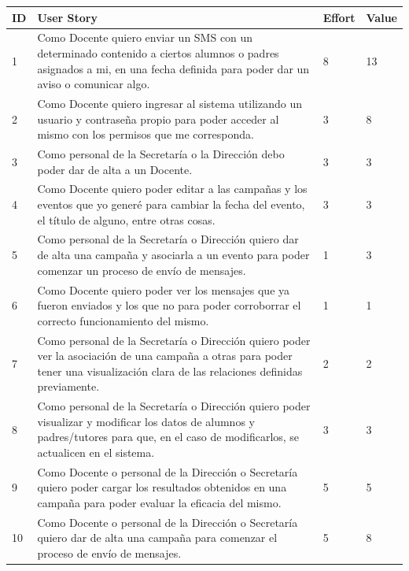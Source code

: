 \documentclass[a4paper, 11pt]{article}
\begin{document}
\begin{table}[H]
\centering
\begin{tabular}{ | p{1cm} | p{10cm} | p{1cm} | p{1cm} |}
\hline
ID & User Story & Effort & Value \\ \hline \hline
1 & Como Docente quiero enviar un SMS con un determinado contenido a ciertos alumnos o padres asignados a mi, en una fecha definida para poder dar un aviso o comunicar algo. & 8 & 13 \\ \hline


2 & Como Docente quiero ingresar al sistema utilizando un usuario y contraseña propio para poder acceder al mismo con los permisos que me corresponda. & 3 & 8 \\ \hline


3 & Como personal de la Secretaría o la Dirección debo poder dar de alta a un Docente. & 3 & 3 \\ \hline


4 & Como Docente quiero poder editar a las campañas y los eventos que yo generé para cambiar la fecha del evento, el título de alguno, entre otras cosas. & 3 & 3 \\ \hline


5 & Como personal de la Secretaría o Dirección quiero dar de alta una campaña y asociarla a un evento para poder comenzar un proceso de envío de mensajes. & 1 & 3 \\ \hline


6 & Como Docente quiero poder ver los mensajes que ya fueron enviados y los que no para poder corroborrar el correcto funcionamiento del mismo. & 1 & 1 \\ \hline


7 & Como personal de la Secretaría o Dirección quiero poder ver la asociación de una campaña a otras para poder tener una visualización clara de las relaciones definidas previamente. & 2 & 2 \\ \hline


8 & Como personal de la Secretaría o Dirección quiero poder visualizar y modificar los datos de alumnos y padres/tutores para que, en el caso de modificarlos, se actualicen en el sistema. & 3 & 3\\ \hline


9 & Como Docente o personal de la Dirección o Secretaría quiero poder cargar los resultados obtenidos en una campaña para poder evaluar la eficacia del mismo.  & 5 & 5 \\ \hline


10 & Como Docente o personal de la Dirección o Secretaría quiero dar de alta una campaña para comenzar el proceso de envío de mensajes. & 5 & 8 \\ \hline



\end{tabular}
\end{table}
\end{document}
